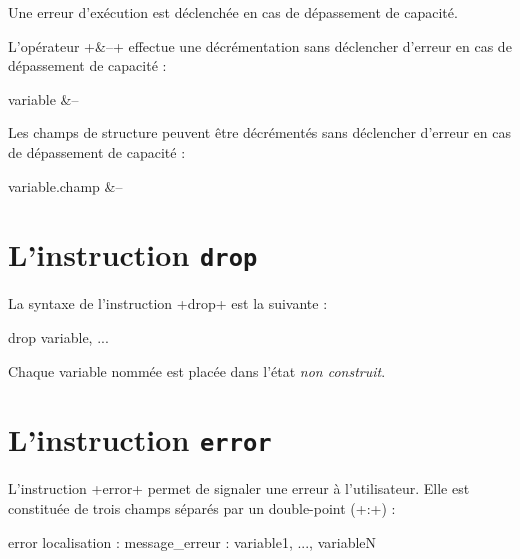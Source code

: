 Une erreur d'exécution est déclenchée en cas de dépassement de capacité.

L'opérateur \ggs+&--+ effectue une décrémentation sans déclencher d'erreur en cas de dépassement de capacité :
\begin{galgasbox}
variable &--
\end{galgasbox}

Les champs de structure peuvent être décrémentés sans déclencher d'erreur en cas de dépassement de capacité :
\begin{galgasbox}
variable.champ &--
\end{galgasbox}




\section{L'instruction \texttt{drop}}

La syntaxe de l'instruction \ggs+drop+ est la suivante :

\begin{galgasbox}
drop variable, ...
\end{galgasbox}

Chaque variable nommée est placée dans l'état \emph{non construit}.








\section{L'instruction \texttt{error}}

L'instruction \ggs+error+ permet de signaler une erreur à l'utilisateur. Elle est constituée de trois champs séparés par un double-point (\ggs+:+) :

\begin{galgasbox}
error localisation : message_erreur : variable1, ..., variableN
\end{galgasbox}



